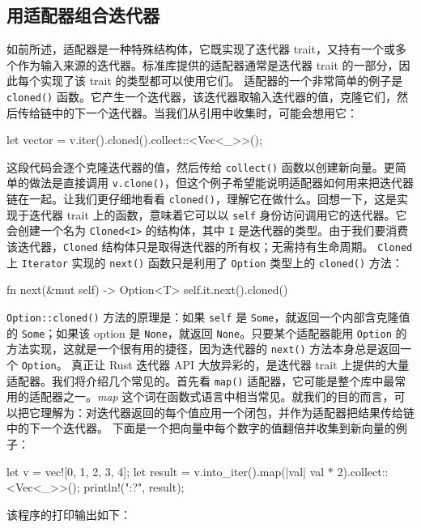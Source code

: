 \subsection{用适配器组合迭代器}
\label{idx:idx_ed06f720}
如前所述，适配器是一种特殊结构体，它既实现了迭代器 trait，又持有一个或多个作为输入来源的迭代器。标准库提供的适配器通常是迭代器 trait 的一部分，因此每个实现了该 trait 的类型都可以使用它们。
适配器的一个非常简单的例子是 \texttt{cloned()} 函数。它产生一个迭代器，该迭代器取输入迭代器的值，克隆它们，然后传给链中的下一个迭代器。当我们从引用中收集时，可能会想用它：
\begin{codebox}[rust]
let vector = v.iter().cloned().collect::<Vec<_>>();
\end{codebox}
\label{idx:idx_e628fee2}
这段代码会逐个克隆迭代器的值，然后传给 \texttt{collect()} 函数以创建新向量。更简单的做法是直接调用 \texttt{v.clone()}，但这个例子希望能说明适配器如何用来把迭代器链在一起。让我们更仔细地看看 \texttt{cloned()}，理解它在做什么。回想一下，这是实现于迭代器 trait 上的函数，意味着它可以以 \texttt{self} 身份访问调用它的迭代器。它会创建一个名为 \texttt{Cloned<I>} 的结构体，其中 \texttt{I} 是迭代器的类型。由于我们要消费该迭代器，\texttt{Cloned} 结构体只是取得迭代器的所有权；无需持有生命周期。
\texttt{Cloned} 上 \texttt{Iterator} 实现的 \texttt{next()} 函数只是利用了
\texttt{Option} 类型上的 \texttt{cloned()} 方法：
\begin{codebox}[rust]
fn next(&mut self) -> Option<T> {
    self.it.next().cloned()
}
\end{codebox}
\texttt{Option::\allowbreak{}cloned(\allowbreak{})\allowbreak{}} 方法的原理是：如果 \texttt{self} 是 \texttt{Some}，就返回一个内部含克隆值的 \texttt{Some}；如果该 option 是 \texttt{None}，就返回 \texttt{None}。只要某个适配器能用 \texttt{Option} 的方法实现，这就是一个很有用的捷径，因为迭代器的 \texttt{next()} 方法本身总是返回一个 \texttt{Option}。
真正让 Rust 迭代器 API 大放异彩的，是迭代器 trait 上提供的大量适配器。我们将介绍几个常见的。首先看 \texttt{map()} 适配器，它可能是整个库中最常用的适配器之一。\emph{map} 这个词在函数式语言中相当常见。就我们的目的而言，可以把它理解为：对迭代器返回的每个值应用一个闭包，并作为适配器把结果传给链中的下一个迭代器。
下面是一个把向量中每个数字的值翻倍并收集到新向量的例子：
\begin{codebox}[rust]
let v = vec![0, 1, 2, 3, 4];
let result = v.into_iter().map(|val| val * 2).collect::<Vec<_>>();
println!("{:?}", result);
\end{codebox}
该程序的打印输出如下：
\begin{codeboxdark}
[0, 2, 4, 6, 8]
\end{codeboxdark}
